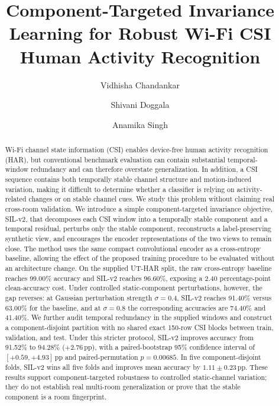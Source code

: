 \documentclass[runningheads]{llncs}
\newcommand{\pp}{\ensuremath{\,\mathrm{pp}}}
\begin{document}
\title{Component-Targeted Invariance Learning for Robust Wi-Fi CSI Human Activity Recognition}


\author{Vidhisha Chandankar \and
Shivani Doggala \and
Anamika Singh}



\maketitle

\begin{abstract}
Wi-Fi channel state information (CSI) enables device-free human activity recognition (HAR), but conventional benchmark evaluation can contain substantial temporal-window redundancy and can therefore overstate generalization. In addition, a CSI sequence contains both temporally stable channel structure and motion-induced variation, making it difficult to determine whether a classifier is relying on activity-related changes or on stable channel cues. We study this problem without claiming real cross-room validation. We introduce a simple component-targeted invariance objective, SIL-v2, that decomposes each CSI window into a temporally stable component and a temporal residual, perturbs only the stable component, reconstructs a label-preserving synthetic view, and encourages the encoder representations of the two views to remain close. The method uses the same compact convolutional encoder as a cross-entropy baseline, allowing the effect of the proposed training procedure to be evaluated without an architecture change. On the supplied UT-HAR split, the raw cross-entropy baseline reaches 99.00\% accuracy and SIL-v2 reaches 96.60\%, exposing a 2.40 percentage-point clean-accuracy cost. Under controlled static-component perturbations, however, the gap reverses: at Gaussian perturbation strength $\sigma=0.4$, SIL-v2 reaches 91.40\% versus 63.00\% for the baseline, and at $\sigma=0.8$ the corresponding accuracies are 74.40\% and 41.40\%. We further audit temporal redundancy in the supplied windows and construct a component-disjoint partition with no shared exact 150-row CSI blocks between train, validation, and test. Under this stricter protocol, SIL-v2 improves accuracy from 91.52\% to 94.28\% ($+2.76\pp$), with a paired-bootstrap 95\% confidence interval of $[+0.59,+4.93]\pp$ and paired-permutation $p=0.00685$. In five component-disjoint folds, SIL-v2 wins all five folds and improves mean accuracy by $1.11\pm0.23\pp$. These results support component-targeted robustness to controlled static-channel variation; they do not establish real multi-room generalization or prove that the stable component is a room fingerprint.
\end{abstract}
\end{document}
